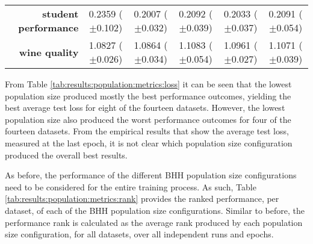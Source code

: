 \begin{table}[htb]
{\begin{tabular}{r|ccccc}
			\textbf{student performance} & \cellcolor[rgb]{ .973,  .412,  .42}0.2359 ($\pm$0.102)      & \cellcolor[rgb]{ .388,  .745,  .482}0.2007 ($\pm$0.032) & \cellcolor[rgb]{ 1,  .922,  .518}0.2092 ($\pm$0.039)    & \cellcolor[rgb]{ .573,  .796,  .49}0.2033 ($\pm$0.037) & \cellcolor[rgb]{ 1,  .922,  .518}0.2091 ($\pm$0.054)    \\
			\textbf{wine quality}        & \cellcolor[rgb]{ .388,  .745,  .482}1.0827 ($\pm$0.026)     & \cellcolor[rgb]{ .553,  .792,  .49}1.0864 ($\pm$0.034)  & \cellcolor[rgb]{ .973,  .412,  .42}1.1083 ($\pm$0.054)  & \cellcolor[rgb]{ 1,  .922,  .518}1.0961 ($\pm$0.027)   & \cellcolor[rgb]{ .976,  .463,  .431}1.1071 ($\pm$0.039) \\
		\end{tabular}%

	}
\end{table}%

From Table \ref{tab:results:population:metrics:loss} it can be seen that the lowest population size produced mostly the best performance outcomes, yielding the best average test loss for eight of the fourteen datasets. However, the lowest population size also produced the worst performance outcomes for four of the fourteen datasets. From the empirical results that show the average test loss, measured at the last epoch, it is not clear which population size configuration produced the overall best results.

As before, the performance of the different \acs{BHH} population size configurations need to be considered for the entire training process. As such, Table \ref{tab:results:population:metrics:rank} provides the ranked performance, per dataset, of each of the \acs{BHH} population size configurations. Similar to before, the performance rank is calculated as the average rank produced by each population size configuration, for all datasets, over all independent runs and epochs.

